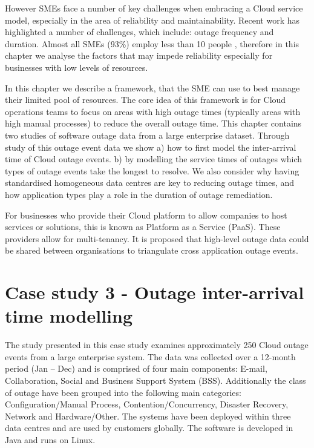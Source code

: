 However SMEs face a number of key challenges when embracing a Cloud service model, especially in the area of reliability and maintainability. Recent work has highlighted a number of challenges, which include: outage frequency and duration. Almost all SMEs (93\%) employ less than 10 people \cite{europa2015sme}, therefore in this chapter we analyse the factors that may impede reliability especially for businesses with low levels of resources. \par

In this chapter we describe a framework, that the SME can use to best manage their limited pool of resources. The core idea of this framework is for Cloud operations teams to focus on areas with high outage times (typically areas with high manual processes) to reduce the overall outage time. This chapter contains two studies of software outage data from a large enterprise dataset. Through study of this outage event data we show a) how to first model the inter-arrival time of Cloud outage events. b) by modelling the service times of outages which types of outage events take the longest to resolve. We also consider why having standardised homogeneous data centres are key to reducing outage times, and how application types play a role in the duration of outage remediation. \par

For businesses who provide their Cloud platform to allow companies to host services or solutions, this is known as Platform as a Service (PaaS). These providers allow for multi-tenancy. It is proposed that  high-level outage data could be shared between organisations to triangulate cross application outage events. \par

\section{Case study 3 - Outage inter-arrival time modelling}
The study presented in this case study examines approximately 250 Cloud outage events from a large enterprise system. The data was collected over a 12-month period (Jan -- Dec) and is comprised of four main components: E-mail, Collaboration, Social and Business Support System (BSS). Additionally the class of outage have been grouped into the following main categories: Configuration/Manual Process, Contention/Concurrency, Disaster Recovery, Network and Hardware/Other. The systems have been deployed within three data centres and are used by customers globally. The software is developed in Java and runs on Linux. \par 

